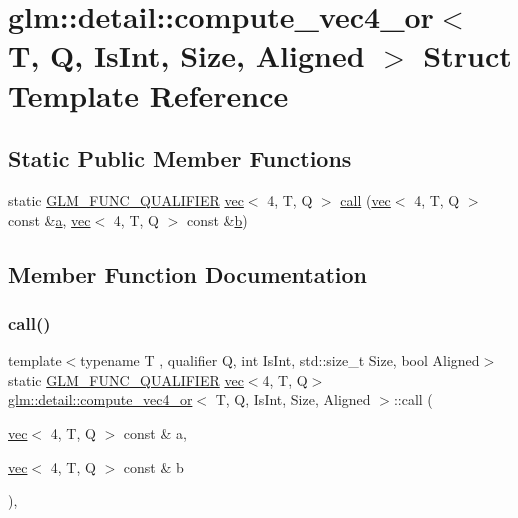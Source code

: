 \hypertarget{structglm_1_1detail_1_1compute__vec4__or}{}\section{glm\+:\+:detail\+:\+:compute\+\_\+vec4\+\_\+or$<$ T, Q, Is\+Int, Size, Aligned $>$ Struct Template Reference}
\label{structglm_1_1detail_1_1compute__vec4__or}
\subsection*{Static Public Member Functions}
\begin{DoxyCompactItemize}
\item 
static \mbox{\hyperlink{setup_8hpp_a33fdea6f91c5f834105f7415e2a64407}{G\+L\+M\+\_\+\+F\+U\+N\+C\+\_\+\+Q\+U\+A\+L\+I\+F\+I\+ER}} \mbox{\hyperlink{structglm_1_1vec}{vec}}$<$ 4, T, Q $>$ \mbox{\hyperlink{structglm_1_1detail_1_1compute__vec4__or_a6d52ef76bd8362c6325edf1eb38a8d65}{call}} (\mbox{\hyperlink{structglm_1_1vec}{vec}}$<$ 4, T, Q $>$ const \&\mbox{\hyperlink{_s_d_l__opengl__glext_8h_a3309789fc188587d666cda5ece79cf82}{a}}, \mbox{\hyperlink{structglm_1_1vec}{vec}}$<$ 4, T, Q $>$ const \&\mbox{\hyperlink{_s_d_l__opengl__glext_8h_a0f71581a41fd2264c8944126dabbd010}{b}})
\end{DoxyCompactItemize}


\subsection{Member Function Documentation}
\mbox{\label{structglm_1_1detail_1_1compute__vec4__or_a6d52ef76bd8362c6325edf1eb38a8d65}} 
\subsubsection{\texorpdfstring{call()}{call()}}
{\footnotesize\ttfamily template$<$typename T , qualifier Q, int Is\+Int, std\+::size\+\_\+t Size, bool Aligned$>$ \\
static \mbox{\hyperlink{setup_8hpp_a33fdea6f91c5f834105f7415e2a64407}{G\+L\+M\+\_\+\+F\+U\+N\+C\+\_\+\+Q\+U\+A\+L\+I\+F\+I\+ER}} \mbox{\hyperlink{structglm_1_1vec}{vec}}$<$4, T, Q$>$ \mbox{\hyperlink{structglm_1_1detail_1_1compute__vec4__or}{glm\+::detail\+::compute\+\_\+vec4\+\_\+or}}$<$ T, Q, Is\+Int, Size, Aligned $>$\+::call (\begin{DoxyParamCaption}\item[{\mbox{\hyperlink{structglm_1_1vec}{vec}}$<$ 4, T, Q $>$ const \&}]{a,  }\item[{\mbox{\hyperlink{structglm_1_1vec}{vec}}$<$ 4, T, Q $>$ const \&}]{b }\end{DoxyParamCaption})\hspace{0.3cm}{\ttfamily [inline]}, {\ttfamily [static]}}



